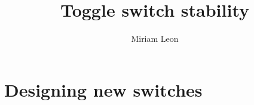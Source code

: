\documentclass[]{../chapter_only}
\title{Toggle switch stability}
\author{Miriam Leon}
\begin{document}

\tableofcontents*
{}


\mainmatter*
\chapter{Designing new switches}

%
%




\printbibliography
\end{document}

